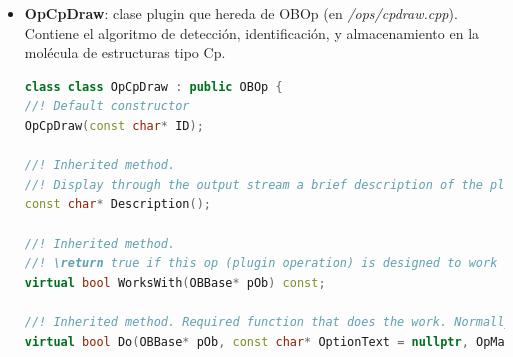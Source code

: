 \begin{itemize}
\begin{lstlisting}[language=C++]
unsigned int _idx;                          //!< Block identifier
std::vector<unsigned int> vidx_atoms;       //!< Vector idx of the atoms that are part of the block.

        public: 

//! Default constructor
BranchBlock();

//! Destructor
~BranchBlock();

//! \return the size of the block (number of atoms in the block)
int Size();

//! \return the block identifier
unsigned int GetIdx();

//! Set the block identifier
void SetIdx(int idx);

//! Add an atom's idx to the block
void AddAtom(int i);

//! \return the idx of the atom at position @p i. Zero based access.
unsigned int GetAtomIdx(int i);

//! \return Whether the @p idx exists within the atoms already inserted in the block
bool HasAtom(int idx);

//! Cp will be possible if all the elements in the block are carbons up to that point and have a bond with an ogm metal.
//! \return whether or not it appears to be a Cp block
bool IsPossibleCp(OBMol &mol)
}; //class
    \end{lstlisting}


    \item \textbf{OpCpDraw}: clase plugin que hereda de OBOp (en \textit{/ops/cpdraw.cpp}). Contiene el algoritmo de detección, identificación, y almacenamiento en la molécula de estructuras tipo Cp.
    \begin{lstlisting}[language=C++]
class class OpCpDraw : public OBOp {
//! Default constructor
OpCpDraw(const char* ID);

//! Inherited method. 
//! Display through the output stream a brief description of the plugin.
const char* Description();

//! Inherited method. 
//! \return true if this op (plugin operation) is designed to work with the class of @p pOb, e.g. OBMol
virtual bool WorksWith(OBBase* pOb) const;

//! Inherited method. Required function that does the work. Normally return true, unless object is not to be output. 
virtual bool Do(OBBase* pOb, const char* OptionText = nullptr, OpMap* pOptions = nullptr, OBConversion* pConv = nullptr);


\end{lstlisting}
\end{itemize}
